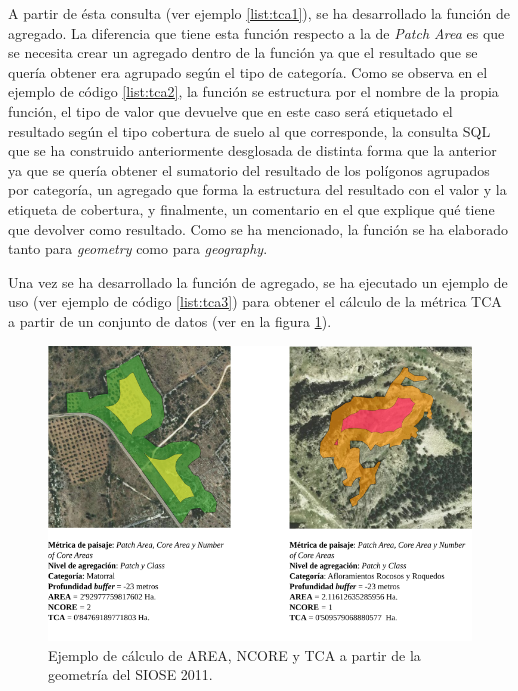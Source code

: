 \label{list:tca1}

A partir de ésta consulta (ver ejemplo \ref{list:tca1}), se ha desarrollado la función de agregado. La diferencia que tiene esta función respecto a la de \textit{Patch Area} es que se necesita crear un agregado dentro de la función ya que el resultado que se quería obtener era agrupado según el tipo de categoría. Como se observa en el ejemplo de código \ref{list:tca2}, la función se estructura por el nombre de la propia función, el tipo de valor que devuelve que en este caso será etiquetado el resultado según el tipo cobertura de suelo al que corresponde, la consulta SQL que se ha construido anteriormente desglosada de distinta forma que la anterior ya que se quería obtener el sumatorio del resultado de los polígonos agrupados por categoría, un agregado que forma la estructura del resultado con el valor y la etiqueta de cobertura, y finalmente, un comentario en el que explique qué tiene que devolver como resultado. Como se ha mencionado, la función se ha elaborado tanto para \textit{geometry} como para \textit{geography}.

\label{list:tca2}

Una vez se ha desarrollado la función de agregado, se ha ejecutado un ejemplo de uso (ver ejemplo de código \ref{list:tca3}) para obtener el cálculo de la métrica TCA a partir de un conjunto de datos (ver en la figura \ref{fig:fig_ejemplo}).

\begin{figure}
\begin{center}
\includegraphics[width=\textwidth]{Metodologia/Figs/figuraejemplo.png}
\caption{Ejemplo de cálculo de AREA, NCORE y TCA a partir de la geometría del SIOSE 2011. \label{fig:fig_ejemplo}}
\end{center}
\end{figure}

